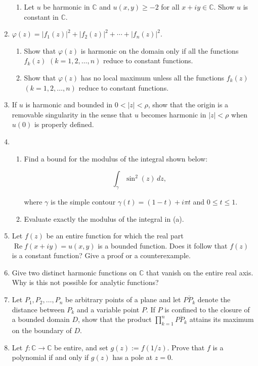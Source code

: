 \documentclass[a4paper,10pt]{article}
\renewcommand{\Re}{\operatorname{Re}}
\begin{document}
\begin{enumerate}
\begin{enumerate}
		\item Let $u$ be harmonic in $\mathbb{C}$ and $u(x,y)\ge-2$ for all $x+iy\in \mathbb{C}$. Show $u$ is constant in $\mathbb{C}$.
		\end{enumerate}
		
		\item $\varphi(z)=|f_{1}(z)|^{2}+|f_{2}(z)|^{2}+\cdots+|f_{n}(z)|^{2}$.
		
		\begin{enumerate}
			\item Show that $\varphi(z)$ is harmonic on the domain only if all the functions $f_{k}(z)$ $(k=1,2,\ldots,n)$ reduce to constant functions.
			\item Show that $\varphi(z)$ has no local maximum unless all the functions $f_{k}(z)$ $(k=1,2,\ldots,n)$ reduce to constant functions.
		\end{enumerate}
		
		\item  If $u$ is harmonic and bounded in $0<|z|<\rho$, show that the origin is a removable singularity in the sense that $u$ becomes harmonic in $|z|<\rho$ when $u(0)$ is properly defined.
		

		
		\item
		\begin{enumerate} 
			\item Find a bound for the modulus of the integral shown below:
		
		\[\int_{\gamma}\sin^{2}(z)\,dz,\]
		
		where $\gamma$ is the simple contour $\gamma(t)=(1-t)+i\pi t$ and $0\le t\le1$.
		
		\item Evaluate exactly the modulus of the integral in (a).
		\end{enumerate}
		
		\item Let $f(z)$ be an entire function for which the real part $\Re f(x+iy)=u(x,y)$ is a bounded function.
		Does it follow that $f(z)$ is a constant function? Give a proof or a counterexample.
		
		\item Give two distinct harmonic functions on $\mathbb{C}$ that vanish on the entire real axis. Why is this not possible for analytic functions?
		
		\item Let $P_{1},P_{2},\ldots,P_{n}$ be arbitrary points of a plane and let $\overline{PP_{k}}$ denote the distance between $P_{k}$ and a variable point $P$. If $P$ is confined to the closure of a bounded domain $D$, show that the product $\prod_{k=1}^{n}\overline{PP_{k}}$ attains its maximum on the boundary of $D$.
		
		\item Let $f:\mathbb{C}\to\mathbb{C}$ be entire, and set $g(z):=f(1/z)$.
		Prove that $f$ is a polynomial if and only if $g(z)$ has a pole at $z=0$.
	\end{enumerate}
	
\end{document}
